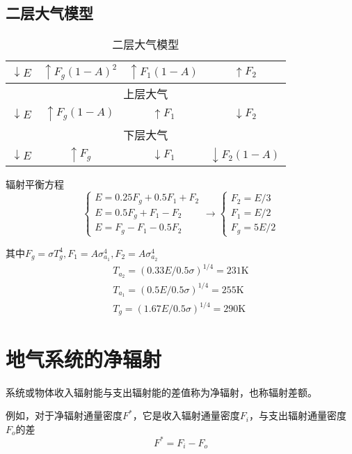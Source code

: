 \documentclass[UTF8,a4paper,11pt,oneside]{ctexbook}
\begin{document}
\subsection{二层大气模型}
\begin{table}[htbp]
    \centering
    \begin{tabular}{cccc}
        \(\downarrow E\)&\(\uparrow F_g(1-A)^2\)&\(\uparrow F_1(1-A)\)&\(\uparrow F_2\)\\
        \hline
        \multicolumn{4}{c}{上层大气}\\
        \hline
        \(\downarrow E\)&\(\uparrow F_g(1-A)\)&\(\uparrow F_1\)&\(\downarrow F_2\)\\
        \hline
        \multicolumn{4}{c}{下层大气}\\
        \hline
        \(\downarrow E\)&\(\uparrow F_g\)&\(\downarrow F_1\)&\(\downarrow F_2(1-A)\)\\
        \hline
        \hline
    \end{tabular}
    \caption{二层大气模型}
\end{table}

辐射平衡方程
\begin{equation}
\begin{cases}
    E=0.25F_g+0.5F_1+F_2\\
    E=0.5F_g+F_1-F_2\\
    E=F_g-F_1-0.5F_2
\end{cases}
\rightarrow
\begin{cases}
    F_2=E/3\\
    F_1=E/2\\
    F_g=5E/2
\end{cases}
\end{equation}

其中\(F_g=\sigma{}T_g^4,F_1=A\sigma{}_{a_1}^4,F_2=A\sigma{}_{a_2}^4\)
\begin{gather}
    T_{a_2}=(0.33E/0.5\sigma)^{1/4}=231\mathrm{K}\\
    T_{a_1}=(0.5E/0.5\sigma)^{1/4}=255\mathrm{K}\\
    T_{g}=(1.67E/0.5\sigma)^{1/4}=290\mathrm{K}
\end{gather}

\section{地气系统的净辐射}
系统或物体收入辐射能与支出辐射能的差值称为净辐射，也称辐射差额。

例如，对于净辐射通量密度\(F^*\)，它是收入辐射通量密度\(F_i\)，与支出辐射通量密度\(F_o\)的差
\begin{equation}
F^*=F_i-F_o
\end{equation}
\end{document}
